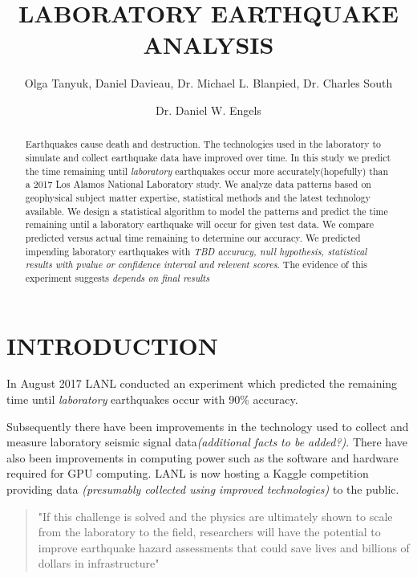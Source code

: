 \documentclass[]{llncs}
\begin{document}

\title{LABORATORY EARTHQUAKE ANALYSIS}

\author{Olga Tanyuk, Daniel Davieau, Dr. Michael L. Blanpied, Dr. Charles South \and Dr. Daniel W. Engels}


\maketitle

\begin{abstract}
Earthquakes cause death and destruction.  The technologies used in the laboratory to simulate and collect earthquake data have improved over time. In this study we predict the time remaining until {\em laboratory} earthquakes occur more accurately(hopefully) than a 2017 Los Alamos National Laboratory study\cite{Bertrand}.  We analyze data patterns based on geophysical subject matter expertise, statistical methods and the latest technology available. We design a statistical algorithm to model the patterns and predict the time remaining until a laboratory earthquake will occur for given test data. We compare predicted versus actual time remaining to determine our accuracy.
We predicted impending laboratory earthquakes with {\em TBD accuracy, null hypothesis, statistical results with pvalue or confidence interval and relevent scores}.
The evidence of this experiment suggests {\em depends on final results}

\end{abstract}
\section{INTRODUCTION}
In August 2017 LANL conducted an experiment\cite{Bertrand} which predicted the remaining time until \emph{laboratory} earthquakes occur with 90\% accuracy. 

Subsequently there have been improvements in the technology used to collect and measure laboratory seismic signal data{\em (additional facts to be added?)}. There have also been improvements in computing power such as the software and hardware required for GPU computing. LANL is now hosting a Kaggle competition providing data {\em (presumably collected using improved technologies)} to the public.
\begin{quote}"If this challenge is solved and the physics are ultimately shown to scale from the laboratory to the field, researchers will have the potential to improve earthquake hazard assessments that could save lives and billions of dollars in infrastructure"\cite{kaggle}\end{quote}
\end{document}

